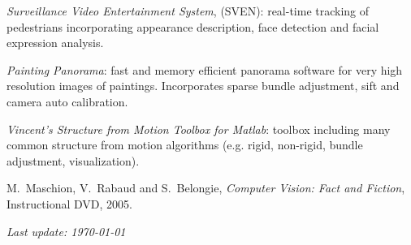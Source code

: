 \begin{llist}
{\em Surveillance Video Entertainment System}, (SVEN): real-time tracking of pedestrians incorporating appearance 
description, face detection and facial expression analysis.

{\em Painting Panorama}: fast and memory efficient panorama software for very high resolution images of paintings.  Incorporates sparse bundle adjustment, sift and camera auto calibration.

{\em Vincent's Structure from Motion Toolbox for Matlab}: toolbox including many common structure from motion algorithms (e.g. rigid, non-rigid, bundle adjustment, visualization).





M.~Maschion, V.~Rabaud and S.~Belongie, {\em Computer Vision: Fact and Fiction},
Instructional DVD, 2005.





\end{llist}

{\em Last update: \today}


